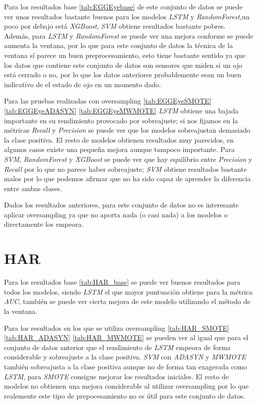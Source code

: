 Para los resultados base \ref{tab:EGGEyebase} de este conjunto de datos se puede ver unos resultados bastante buenos para los modelos \textit{LSTM} y \textit{RandomForest},un poco por debajo está \textit{XGBoost}, \textit{SVM} obtiene resultados bastante pobres. Además, para \textit{LSTM} y \textit{RandomForest} se puede ver una mejora conforme se puede aumenta la ventana, por lo que para este conjunto de datos la técnica de la ventana sí parece un buen preprocesamiento, esto tiene bastante sentido ya que los datos que contiene este conjunto de datos son sensores que miden si un ojo está cerrado o no, por lo que los datos anteriores probablemente sean un buen indicativo de el estado de ojo en un momento dado.\newline

Para las pruebas realizadas con oversampling \ref{tab:EGGEyeSMOTE} \ref{tab:EGGEyeADASYN} \ref{tab:EGGEyeMWMOTE} \textit{LSTM} obtiene una bajada importante en su rendimiento provocado por sobreajuste; si nos fijamos en la métricas \textit{Recall} y \textit{Precision} se puede ver que los modelos sobreajustan demasiado la clase positiva. El resto de modelos obtienen resultados muy parecidos, en algunos casos existe una pequeña mejora aunque tampoco importante. Para \textit{SVM}, \textit{RandomForest} y \textit{XGBoost} se puede ver que hay equilibrio entre \textit{Precision} y \textit{Recall} por lo que no parece haber sobreajuste; \textit{SVM} obtiene resultados bastante malos por lo que podemos afirmar que no ha sido capaz de aprender la diferencia entre ambas clases.\newline

Dados los resultados anteriores, para este conjunto de datos no es interesante aplicar oversampling ya que no aporta nada (o casi nada) a los modelos o directamente los empeora.


\section{HAR}

Para los resultados base \ref{tab:HAR_base} se puede ver buenos resultados para todos los modelos, siendo \textit{LSTM} el que mayor puntuación obtiene para la métrica \textit{AUC}, también se puede ver cierta mejora de este modelo utilizando el método de la ventana.\newline

Para los resultados en los que se utiliza oversampling \ref{tab:HAR_SMOTE} \ref{tab:HAR_ADASYN} \ref{tab:HAR_MWMOTE} se pueden ver al igual que para el conjunto de datos anterior que el rendimiento de \textit{LSTM} empeora de forma considerable y sobreajuste a la clase positiva. \textit{SVM} con \textit{ADASYN} y \textit{MWMOTE} también sobreajusta a la clase positiva aunque no de forma tan exagerada como \textit{LSTM}, para \textit{SMOTE} consigue mejorar los resultados iniciales. El resto de modelos no obtienen una mejora considerable al utilizar oversampling por lo que realemente este tipo de prepocesamiento no es útil para este conjunto de datos.\newline

